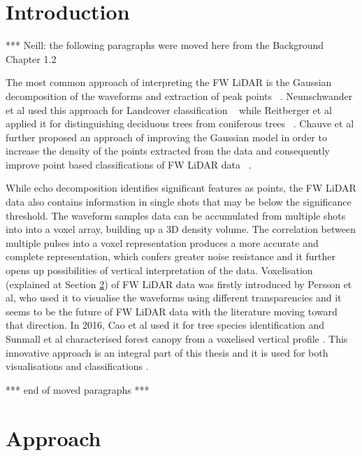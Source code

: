 \documentclass{subfiles}
\begin{document}
\section{Introduction}
	\par {\color{red} *** Neill: the following paragraphs were moved here from the Background Chapter 1.2}
		
	\par The most common approach of interpreting the FW LiDAR is the Gaussian decomposition of the waveforms and extraction of peak points ~\cite{Wanger2006}. Neunschwander et al used this approach for Landcover classification ~\cite{Neuenschwander2009} while Reitberger et al applied it for distinguishing deciduous trees from coniferous trees ~\cite{Reitberger2008}. Chauve et al further proposed an approach of improving the Gaussian model in order to increase the density of the points extracted from the data and consequently improve point based classifications of FW LiDAR data ~\cite{Chauve2007}. 


	\par While echo decomposition identifies significant features as points, the FW LiDAR data also contains information in single shots that may be below the significance threshold. The waveform samples data can be accumulated from multiple shots into {\color{blue} into a voxel array, building up a 3D density volume. The correlation between multiple pulses into a voxel representation produces a more accurate and complete representation, which confers greater noise resistance and it further opens up possibilities of vertical interpretation of the data. Voxelisation (explained at Section \ref{sec:Vox:Approach}) of FW LiDAR data} was firstly introduced by Persson et al, who used it to visualise the waveforms using different transparencies \cite{Persson2005} and it seems to be the future of FW LiDAR data with the literature moving toward that direction. In 2016, Cao et al used it for tree species identification \cite{Cao2016} and Sunmall et al characterised forest canopy from a voxelised vertical profile \cite{Sumnall2016}. This innovative approach is an integral part of this thesis and it is used for both visualisations and classifications \cite{Miltiadou2014}\cite{Miltiadou2015}. 

	\par {\color{red} *** end of moved paragraphs *** }
		
		

	
\section{Approach}\label{sec:Vox:Approach}
\end{document}
